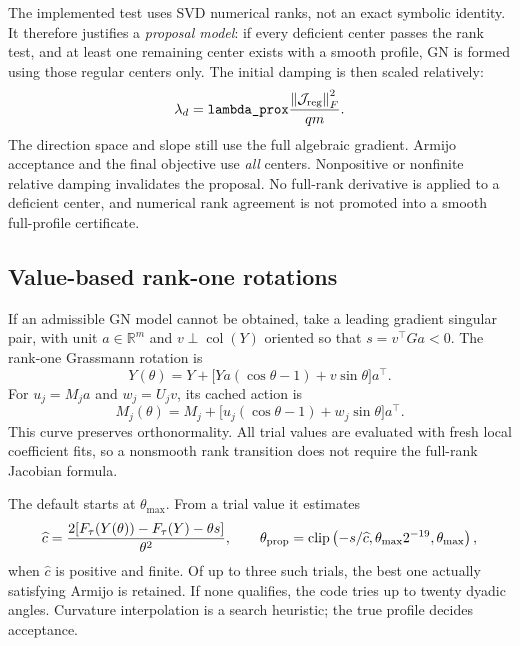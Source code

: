 \documentclass[11pt,a4paper]{article}
\newcommand{\R}{\mathbb R}
\newcommand{\col}{\operatorname{col}}
\newcommand{\norm}[1]{\left\lVert#1\right\rVert}
\newcommand{\code}[1]{\texttt{\detokenize{#1}}}
\begin{document}
The implemented test uses SVD numerical ranks, not an exact symbolic
identity. It therefore justifies a \emph{proposal model}: if every deficient
center passes the rank test, and at least one remaining center exists with
a smooth profile, GN is formed using those regular centers only. The
initial damping is then scaled relatively:
\begin{equation}\label{eq:relative}
 \lambda_d=\code{lambda_prox}\frac{\norm{\mathcal J_{\rm reg}}_F^2}{qm}.
\end{equation}
The direction space and slope still use the full algebraic gradient.
Armijo acceptance and the final objective use \emph{all} centers.
Nonpositive or nonfinite relative damping invalidates the proposal.
No full-rank derivative is applied to a deficient center, and numerical
rank agreement is not promoted into a smooth full-profile certificate.

\subsection{Value-based rank-one rotations}
If an admissible GN model cannot be obtained, take a leading gradient
singular pair, with unit $a\in\R^m$ and $v\perp\col(Y)$ oriented so that
$s=v^\top Ga<0$. The rank-one Grassmann rotation is
\begin{equation}\label{eq:rank-one}
 Y(\theta)=Y+\bigl[Ya(\cos\theta-1)+v\sin\theta\bigr]a^\top.
\end{equation}
For $u_j=M_ja$ and $w_j=U_jv$, its cached action is
\begin{equation}
 M_j(\theta)=M_j+
 \bigl[u_j(\cos\theta-1)+w_j\sin\theta\bigr]a^\top.
\end{equation}
This curve preserves orthonormality. All trial values are evaluated with
fresh local coefficient fits, so a nonsmooth rank transition does not
require the full-rank Jacobian formula.

The default \code{quadratic_trials=3} starts at $\theta_{\max}$. From a
trial value it estimates
\begin{equation}\label{eq:quadratic}
 \widehat c=\frac{2[F_\tau(Y(\theta))-F_\tau(Y)-\theta s]}{\theta^2},
 \qquad
 \theta_{\rm prop}=\operatorname{clip}
 \left(-s/\widehat c,\theta_{\max}2^{-19},\theta_{\max}\right),
\end{equation}
when $\widehat c$ is positive and finite. Of up to three such trials, the
best one actually satisfying Armijo is retained. If none qualifies, the
code tries up to twenty dyadic angles. Curvature interpolation is a search
heuristic; the true profile decides acceptance.
\end{document}
